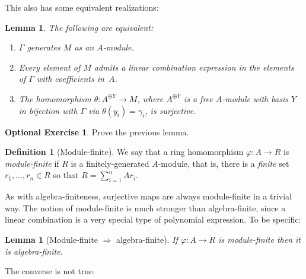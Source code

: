 \documentclass{amsart}[12pt]
\numberwithin{equation}{section}
\theoremstyle{plain} %
\newtheorem{lem}[equation]{Lemma}
\theoremstyle{definition}
\newtheorem{defn}[equation]{Definition}
\newtheorem{exer}[equation]{Optional Exercise}
\theoremstyle{remark}
\begin{document}
This also has some equivalent realizations:

\begin{lem}
\label{lem:modulegen}
The following are equivalent:
\begin{enumerate}
	\item $\Gamma$ generates $M$ as an $A$-module.
	\item Every element of $M$ admits a linear combination expression in the elements of $\Gamma$ with coefficients in~$A$.
	\item The homomorphism $\theta:A^{\oplus Y} \to M$, where $A^{\oplus Y}$ is a free $A$-module with basis  $Y$ in bijection with $\Gamma$ via $\theta(y_i)=\gamma_i$, is surjective.
\end{enumerate}
\end{lem}

\begin{exer} Prove the previous lemma.
\end{exer}

\begin{defn}[Module-finite]
We say that a ring homomorphism $\varphi:A\to R$ is \emph{module-finite} if $R$ is a finitely-generated $A$-module, that is, there is a {\em finite} set $r_1,\ldots, r_n \in R$ so that $R=\sum_{i=1}^n  A r_i$. 
\end{defn}


As with algebra-finiteness, surjective maps are always module-finite in a trivial way. 
The notion of module-finite is much stronger than algebra-finite, since a linear combination is a very special type of polynomial expression. To be specific:

\begin{lem}[Module-finite $\Rightarrow$ algebra-finite]
\label{lem:MFimpliesAF}
If $\varphi:A\to R$ is module-finite then it is algebra-finite.
\end{lem}

The converse is not true.
\end{document}
